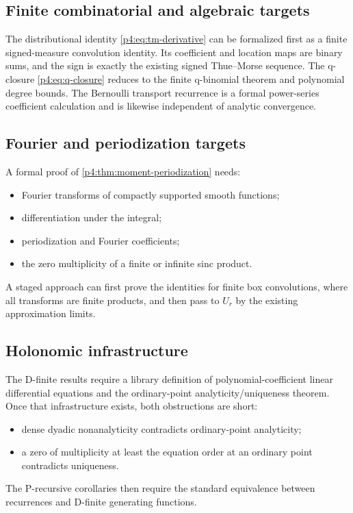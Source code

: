 \documentclass[11pt]{article}
\numberwithin{equation}{section}
\theoremstyle{definition}
\theoremstyle{remark}
\begin{document}
\subsection{Finite combinatorial and algebraic targets}
The distributional identity \eqref{p4:eq:tm-derivative} can be formalized first as a finite signed-measure convolution identity.  Its coefficient and location maps are binary sums, and the sign is exactly the existing signed Thue--Morse sequence.  The q-closure \eqref{p4:eq:q-closure} reduces to the finite q-binomial theorem and polynomial degree bounds.  The Bernoulli transport recurrence is a formal power-series coefficient calculation and is likewise independent of analytic convergence.

\subsection{Fourier and periodization targets}
A formal proof of \cref{p4:thm:moment-periodization} needs:
\begin{itemize}
\item Fourier transforms of compactly supported smooth functions;
\item differentiation under the integral;
\item periodization and Fourier coefficients;
\item the zero multiplicity of a finite or infinite sinc product.
\end{itemize}
A staged approach can first prove the identities for finite box convolutions, where all transforms are finite products, and then pass to $U_r$ by the existing approximation limits.

\subsection{Holonomic infrastructure}
The D-finite results require a library definition of polynomial-coefficient linear differential equations and the ordinary-point analyticity/uniqueness theorem.  Once that infrastructure exists, both obstructions are short:
\begin{itemize}
\item dense dyadic nonanalyticity contradicts ordinary-point analyticity;
\item a zero of multiplicity at least the equation order at an ordinary point contradicts uniqueness.
\end{itemize}
The P-recursive corollaries then require the standard equivalence between recurrences and D-finite generating functions.
\end{document}
